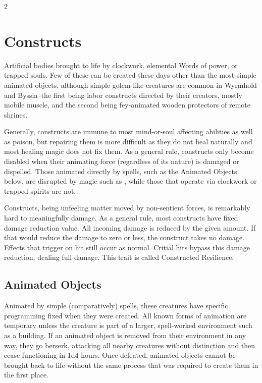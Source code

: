 \clearpage
\begin{multicols}{2}
\section{Constructs}

	\raggedcolumns
Artificial bodies brought to life by clockwork, elemental Words of power, or trapped souls. Few of these can be created these days other than the most simple animated objects, although simple golem-like creatures are common in Wyrmhold and Byssia--the first being labor constructs directed by their creators, mostly mobile muscle, and the second being fey-animated wooden protectors of remote shrines.

Generally, constructs are immune to most mind-or-soul affecting abilities as well as poison, but repairing them is more difficult as they do not heal naturally and most healing magic does not fix them. As a general rule, constructs only become disabled when their animating force (regardless of its nature) is damaged or dispelled. Those animated directly by spells, such as the Animated Objects below, are disrupted by magic such as , while those that operate via clockwork or trapped spirits are not.

Constructs, being unfeeling matter moved by non-sentient forces, is remarkably hard to meaningfully damage. As a general rule, most constructs have fixed damage reduction value. All incoming damage is reduced by the given amount. If that would reduce the damage to zero or less, the construct takes no damage. Effects that trigger on hit still occur as normal. Critial hits bypass this damage reduction, dealing full damage. This trait is called Constructed Resilience.

\subsection{Animated Objects}

Animated by simple (comparatively) spells, these creatures have specific programming fixed when they were created. All known forms of animation are temporary unless the creature is part of a larger, spell-worked environment such as a building. If an animated object is removed from their environment in any way, they go berserk, attacking all nearby creatures without distinction and then cease functioning in 1d4 hours. Once defeated, animated objects cannot be brought back to life without the same process that was required to create them in the first place.


\end{multicols}
